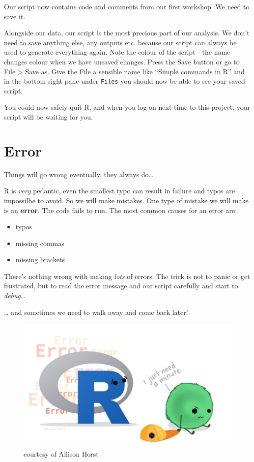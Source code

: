 \documentclass[
]{book}
\begin{document}
Our script now contains code and comments from our first workshop. We need to save it.

Alongside our data, our script is the most precious part of our analysis. We don't need to save anything else, any outputs etc. because our script can always be used to generate everything again. Note the colour of the script - the name changes colour when we have unsaved changes. Press the Save button or go to File \textgreater{} Save as.
Give the File a sensible name like ``Simple commands in R'' and in the bottom right pane under \texttt{Files} you should now be able to see your saved script.

You could now safely quit R, and when you log on next time to this project, your script will be waiting for you.

\hypertarget{error}{%
\section{Error}\label{error}}

Things will go wrong eventually, they always do\ldots{}

R is \emph{very} pedantic, even the smallest typo can result in failure and typos are impossilbe to avoid. So we will make mistakes. One type of mistake we will make is an \textbf{error}. The code fails to run. The most common causes for an error are:

\begin{itemize}
\item
  typos
\item
  missing commas
\item
  missing brackets
\end{itemize}

There's nothing wrong with making \emph{lots} of errors. The trick is not to panic or get frustrated, but to read the error message and our script carefully and start to \emph{debug}\ldots{}

\ldots{} and sometimes we need to walk away and come back later!

\begin{figure}
\includegraphics[width=0.8\linewidth]{images/Error} \caption{courtesy of Allison Horst}\label{fig:unnamed-chunk-28}
\end{figure}
\end{document}
